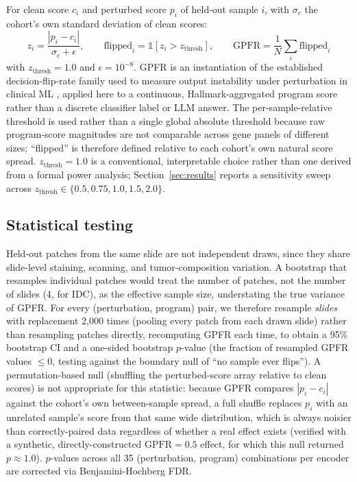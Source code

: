 \documentclass[11pt]{article}
\begin{document}
For clean score $c_i$ and perturbed score $p_i$ of held-out sample $i$, with $\sigma_c$ the cohort's own standard deviation of clean scores:
\begin{equation}
z_i = \frac{|p_i - c_i|}{\sigma_c + \epsilon}, \qquad \text{flipped}_i = \mathbb{1}[z_i > z_{\text{thresh}}], \qquad \text{GPFR} = \frac{1}{N}\sum_i \text{flipped}_i
\end{equation}
with $z_{\text{thresh}}=1.0$ and $\epsilon=10^{-8}$. GPFR is an instantiation of the established decision-flip-rate family used to measure output instability under perturbation in clinical ML \citep{decisionflip_2603, decisionflip_2606}, applied here to a continuous, Hallmark-aggregated program score rather than a discrete classifier label or LLM answer. The per-sample-relative threshold is used rather than a single global absolute threshold because raw program-score magnitudes are not comparable across gene panels of different sizes; ``flipped'' is therefore defined relative to each cohort's own natural score spread. $z_{\text{thresh}}=1.0$ is a conventional, interpretable choice rather than one derived from a formal power analysis; Section~\ref{sec:results} reports a sensitivity sweep across $z_{\text{thresh}}\in\{0.5,0.75,1.0,1.5,2.0\}$.

\subsection{Statistical testing}
Held-out patches from the same slide are not independent draws, since they share slide-level staining, scanning, and tumor-composition variation. A bootstrap that resamples individual patches would treat the number of patches, not the number of slides (4, for IDC), as the effective sample size, understating the true variance of GPFR. For every (perturbation, program) pair, we therefore resample \emph{slides} with replacement 2{,}000 times (pooling every patch from each drawn slide) rather than resampling patches directly, recomputing GPFR each time, to obtain a 95\% bootstrap CI and a one-sided bootstrap $p$-value (the fraction of resampled GPFR values $\le 0$, testing against the boundary null of ``no sample ever flips''). A permutation-based null (shuffling the perturbed-score array relative to clean scores) is not appropriate for this statistic: because GPFR compares $|p_i - c_i|$ against the cohort's own between-sample spread, a full shuffle replaces $p_i$ with an unrelated sample's score from that same wide distribution, which is always noisier than correctly-paired data regardless of whether a real effect exists (verified with a synthetic, directly-constructed $\text{GPFR}=0.5$ effect, for which this null returned $p\approx1.0$). $p$-values across all 35 (perturbation, program) combinations per encoder are corrected via Benjamini-Hochberg FDR.
\end{document}
